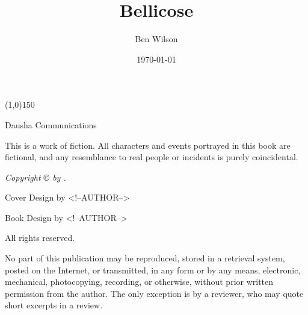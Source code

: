 \documentclass[11pt,twoside,makeidx]{memoir}
\title{Bellicose}
\author{Ben Wilson}
\date{\today}
\begin{document}
\frontmatter
  \begin{titlingpage}
  \pagestyle{empty}
  \begin{center}
  \vspace*{\fill}

  \HUGE\textbf{\textsf\thetitle}

  \vspace*{0.25in}
  \line(1,0){150}
  \vspace*{0.25in}

  \Large\textsf\theauthor

  \vspace*{\fill}

  \vspace*{\fill}
  \hspace*{\fill}\textsf{Dausha}\hspace*{\fill}\newline%
  \textsf{Communications}
  \end{center}
  \end{titlingpage}

  \vspace*{\fill}
  \pagestyle{empty}

  \par\noindent\emph{\thetitle}
  \newline
  
  \par\noindent This is a work of fiction. All characters and events portrayed in this
  book are fictional, and any resemblance to real people or incidents is
  purely coincidental.\newline

  \par\noindent\emph{Copyright \copyright{} \yearonly{} by \theauthor.}\newline
  
  \par\noindent Cover Design by <!--AUTHOR-->\newline

  \par\noindent Book Design by <!--AUTHOR-->\newline

  \par\noindent All rights reserved.\newline

  \par\noindent No part of this publication may be reproduced, stored in a retrieval system, posted on the Internet, or transmitted, in any form or by any means, electronic, mechanical, photocopying, recording, or otherwise, without prior written permission from the author. The only exception is by a reviewer, who may quote short excerpts in a review.\newline
\end{document}
